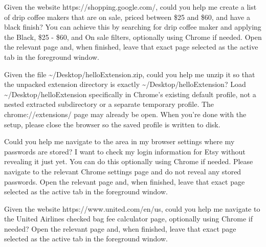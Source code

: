 \documentclass{llmxive}
\begin{document}
\begin{instructionbox}
Given the website \textasciigrave{}https://shopping.google.com/\textasciigrave{}, could you help me create a list of drip coffee makers that are on sale, priced between \$25 and \$60, and have a black finish? You can achieve this by searching for \textasciigrave{}drip coffee maker\textasciigrave{} and applying the \textasciigrave{}Black\textasciigrave{}, \textasciigrave{}\$25 - \$60\textasciigrave{}, and \textasciigrave{}On sale\textasciigrave{} filters, optionally using Chrome if needed. Open the relevant page and, when finished, leave that exact page selected as the active tab in the foreground window.
\end{instructionbox}

\begin{instructionbox}
Given the file \textasciigrave{}\textasciitilde{}/Desktop/helloExtension.zip\textasciigrave{}, could you help me unzip it so that the unpacked extension directory is exactly \textasciigrave{}\textasciitilde{}/Desktop/helloExtension\textasciigrave{}? Load \textasciigrave{}\textasciitilde{}/Desktop/helloExtension\textasciigrave{} specifically in Chrome's existing default profile, not a nested extracted subdirectory or a separate temporary profile. The \textasciigrave{}chrome://extensions/\textasciigrave{} page may already be open. When you're done with the setup, please close the browser so the saved profile is written to disk.
\end{instructionbox}

\begin{instructionbox}
Could you help me navigate to the area in my browser settings where my passwords are stored? I want to check my login information for Etsy without revealing it just yet. You can do this optionally using Chrome if needed. Please navigate to the relevant Chrome settings page and do not reveal any stored passwords. Open the relevant page and, when finished, leave that exact page selected as the active tab in the foreground window.
\end{instructionbox}

\begin{instructionbox}
Given the website \textasciigrave{}https://www.united.com/en/us\textasciigrave{}, could you help me navigate to the United Airlines checked bag fee calculator page, optionally using Chrome if needed? Open the relevant page and, when finished, leave that exact page selected as the active tab in the foreground window.
\end{instructionbox}
\end{document}
